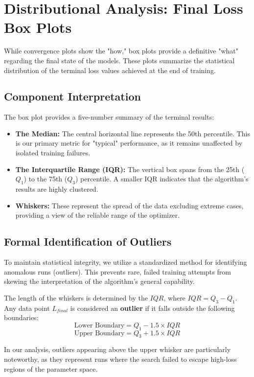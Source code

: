 \section{Distributional Analysis: Final Loss Box Plots}
While convergence plots show the "how," box plots provide a definitive "what" regarding the final state of the models. These plots summarize the statistical distribution of the terminal loss values achieved at the end of training.

\subsection{Component Interpretation}
The box plot provides a five-number summary of the terminal results:
\begin{itemize}
    \item \textbf{The Median:} The central horizontal line represents the 50th percentile. This is our primary metric for "typical" performance, as it remains unaffected by isolated training failures.
    \item \textbf{The Interquartile Range (IQR):} The vertical box spans from the 25th ($Q_1$) to the 75th ($Q_3$) percentile. A smaller IQR indicates that the algorithm's results are highly clustered.
    \item \textbf{Whiskers:} These represent the spread of the data excluding extreme cases, providing a view of the reliable range of the optimizer.
\end{itemize}



\subsection{Formal Identification of Outliers}
To maintain statistical integrity, we utilize a standardized method for identifying anomalous runs (outliers). This prevents rare, failed training attempts from skewing the interpretation of the algorithm's general capability.

The length of the whiskers is determined by the $IQR$, where $IQR = Q_3 - Q_1$. Any data point $L_{final}$ is considered an \textbf{outlier} if it falls outside the following boundaries:
$$ \text{Lower Boundary} = Q_1 - 1.5 \times IQR $$
$$ \text{Upper Boundary} = Q_3 + 1.5 \times IQR $$

In our analysis, outliers appearing above the upper whisker are particularly noteworthy, as they represent runs where the search failed to escape high-loss regions of the parameter space.
